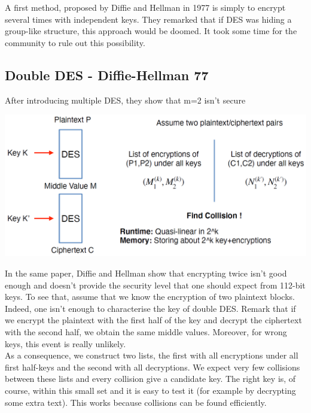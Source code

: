 		A first method, proposed by Diffie and Hellman in 1977 is simply to encrypt several times with independent keys. 
		They remarked that if DES was hiding a group-like structure, this approach would be doomed. 
		It took some time for the community to rule out this possibility.

\newpage
	\subsection{Double DES - Diffie-Hellman 77}
		After introducing multiple DES, they show that m=2 isn’t secure
		\begin{center}
			\includegraphics[width=140mm]{Graphics/Cryptanalysis/c2.png}
		\end{center}
		In the same paper, Diffie and Hellman show that encrypting twice isn’t good enough and doesn’t provide the security level that one should expect from 112-bit keys. 
		To see that, assume that we know the encryption of two plaintext blocks. 
		Indeed, one isn’t enough to characterise the key of double DES.
		Remark that if we encrypt the plaintext with the first half of the key and decrypt the ciphertext with the second half, we obtain the same middle values. 
		Moreover, for wrong keys, this event is really unlikely.\\
		
		As a consequence, we construct two lists, the first with all encryptions under all first half-keys and the second with all decryptions. 
		We expect very few collisions between these lists and every collision give a candidate key. 
		The right key is, of course, within this small set and it is easy to test it (for example by decrypting some extra text). 
		This works because collisions can be found efficiently.


